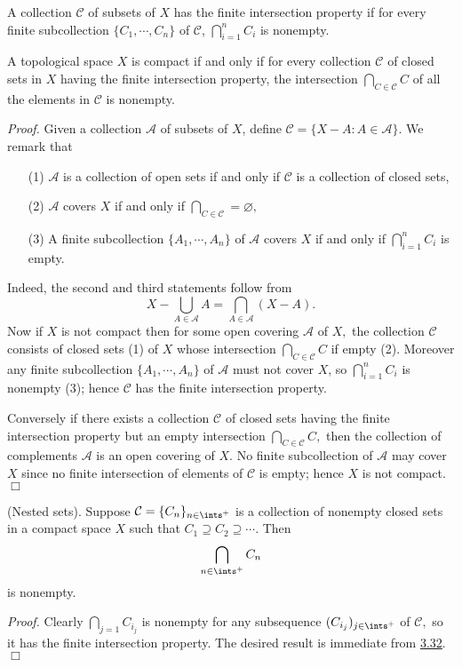 \begin{definition}\label{3.31}
    A collection $\mathcal{C}$ of subsets of $X$ has the finite intersection property if for every finite subcollection $\{C_1, \cdots, C_n\}$ of $\mathcal{C}$, $\bigcap_{i=1}^n C_i$ is nonempty.
\end{definition}
\begin{theorem}\label{3.32}
    A topological space $X$ is compact if and only if for every collection $\mathcal{C}$ of closed sets in $X$ having the finite intersection property, the intersection $\bigcap_{C \in \mathcal{C}} C$ of all the elements in $\mathcal{C}$ is nonempty.
\end{theorem}
{\it Proof.} Given a collection $\mathcal{A}$ of subsets of $X$, define $\mathcal{C} = \{X-A: A \in \mathcal{A}\}.$ We remark that
\begin{enumerate}
    \item[(1)] $\mathcal{A}$ is a collection of open sets if and only if $\mathcal{C}$ is a collection of closed sets,
    \item[(2)] $\mathcal{A}$ covers $X$ if and only if $\bigcap_{C \in \mathcal{C}} = \varnothing,$
    \item[(3)] A finite subcollection $\{A_1, \cdots, A_n\}$ of $\mathcal{A}$ covers $X$ if and only if $\bigcap_{i=1}^n C_i$ is empty.
\end{enumerate}
Indeed, the second and third statements follow from
$$X - \bigcup_{A \in \mathcal{A}} A = \bigcap_{A \in \mathcal{A}} (X-A).$$
Now if $X$ is not compact then for some open covering $\mathcal{A}$ of $X,$ the collection $\mathcal{C}$ consists of closed sets (1) of $X$ whose intersection $\bigcap_{C \in \mathcal{C}} C$ if empty (2). Moreover any finite subcollection $\{A_1, \cdots, A_n\}$ of $\mathcal{A}$ must not cover $X$, so $\bigcap_{i=1}^n C_i$ is nonempty (3); hence $\mathcal{C}$ has the finite intersection property.

Conversely if there exists a collection $\mathcal{C}$ of closed sets having the finite intersection property but an empty intersection $\bigcap_{C \in \mathcal{C}} C,$ then the collection of complements $\mathcal{A}$ is an open covering of $X.$ No finite subcollection of $\mathcal{A}$ may cover $X$ since no finite intersection of elements of $\mathcal{C}$ is empty; hence $X$ is not compact. $\Box$

\begin{corollary}\label{3.33}
    (Nested sets). Suppose $\mathcal{C} = \{C_n\}_{n \in \ints^+}$ is a collection of nonempty closed sets in a compact space $X$ such that $C_1 \supseteq C_2 \supseteq \cdots.$ Then
    $$\bigcap_{n \in \ints^+} C_n$$
    is nonempty.
\end{corollary}
{\it Proof.} Clearly $\bigcap_{j=1} C_{i_j}$ is nonempty for any subsequence $(C_{i_j})_{j \in \ints^+}$ of $\mathcal{C},$ so it has the finite intersection property. The desired result is immediate from \hyperref[3.32]{3.32}. $\Box$

